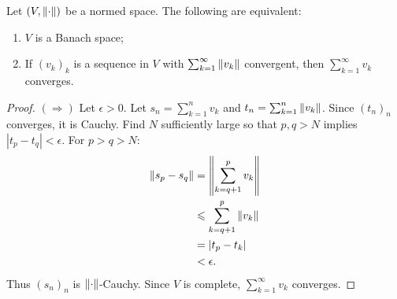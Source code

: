 \documentclass[11pt,twoside,openany]{memoir}
\begin{document}
    \begin{proposition}\label{prop:banach-iff-absolute}
        Let $(V,\left\lVert \cdot \right\rVert)$ be a normed space. The following are equivalent:
            \begin{enumerate}[label = (\arabic*),itemsep=1pt,topsep=3pt]
                \item $V$ is a Banach space;
                \item If $(v_k)_k$ is a sequence in $V$ with $\sum_{k = 1}^\infty \left\lVert v_k \right\rVert$ convergent, then $\sum_{ k =1}^\infty v_k$ converges.
            \end{enumerate}
    \end{proposition}
        \begin{proof}
            $(\Rightarrow)$ Let $\epsilon > 0$. Let $s_n = \sum_{k = 1}^n v_k$ and $t_n = \sum_{k = 1}^n \left\lVert v_k \right\rVert$. Since $(t_n)_n$ converges, it is Cauchy. Find $N$ sufficiently large so that $p,q > N$ implies $|t_p - t_q| < \epsilon$. For $p>q > N$:
                \begin{equation*}
                \begin{split}
                    \left\lVert s_p - s_q \right\rVert
                    & = \left\lVert \sum_{k = q+1}^p v_k \right\rVert \\
                    & \leqslant \sum_{k = q+1}^p \left\lVert v_k \right\rVert \\
                    & = |t_p - t_k|\\
                    & < \epsilon.
                \end{split}
                \end{equation*}
            Thus $(s_n)_n$ is $\left\lVert \cdot \right\rVert$-Cauchy. Since $V$ is complete, $\sum_{k = 1}^\infty v_k$ converges.


\end{proof}
\end{document}

